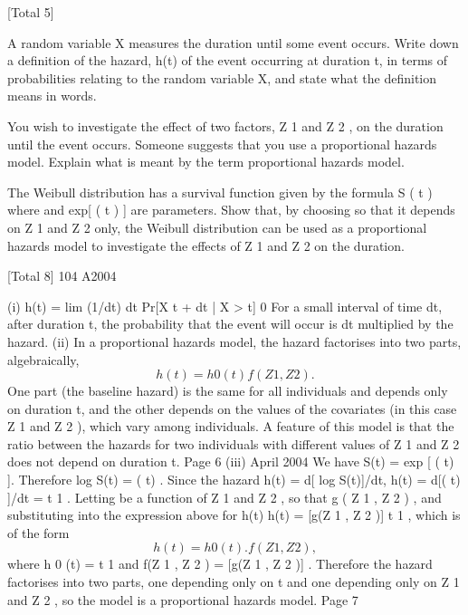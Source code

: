 \documentclass[a4paper,12pt]{article}
\begin{document}
[Total 5]
\item  A random variable X measures the duration until some event occurs. Write
down a definition of the hazard, h(t) of the event occurring at duration t, in
terms of probabilities relating to the random variable X, and state what the
definition means in words.

\item  You wish to investigate the effect of two factors, Z 1 and Z 2 , on the duration
until the event occurs. Someone suggests that you use a proportional hazards
model. Explain what is meant by the term proportional hazards model.

\item  The Weibull distribution has a survival function given by the formula
S ( t )
where and
exp[ ( t ) ]
are parameters.
Show that, by choosing so that it depends on Z 1 and Z 2 only, the Weibull
distribution can be used as a proportional hazards model to investigate the
effects of Z 1 and Z 2 on the duration.

[Total 8]
104 A2004

(i)
h(t) = lim (1/dt)
dt
Pr[X
t + dt | X > t]
0
For a small interval of time dt, after duration t, the probability that the event
will occur is dt multiplied by the hazard.
(ii)
In a proportional hazards model, the hazard factorises into two parts,
algebraically,
\[h ( t ) = h 0 ( t ) f ( Z 1 , Z 2 ) .\]
One part (the baseline hazard) is the same for all individuals and depends only
on duration t, and
the other depends on the values of the covariates (in this case Z 1 and Z 2 ),
which vary among individuals.
A feature of this model is that the ratio between the hazards for two
individuals with different values of Z 1 and Z 2 does not depend on duration t.
Page 6 %
(iii)
April 2004
We have
S(t) = exp [ ( t) ].
Therefore
log S(t) = ( t) .
Since the hazard h(t) = d[ log S(t)]/dt,
h(t) = d[( t) ]/dt =
t
1 .
Letting be a function of Z 1 and Z 2 , so that
g ( Z 1 , Z 2 ) ,
and substituting into the expression above for h(t)
h(t) = [g(Z 1 , Z 2 )]
t
1 ,
which is of the form
\[h(t) = h 0 (t) . f(Z 1 , Z 2 ),\]
where
h 0 (t) = t
1
and f(Z 1 , Z 2 ) = [g(Z 1 , Z 2 )] .
Therefore the hazard factorises into two parts, one depending only on t and
one depending only on Z 1 and Z 2 , so the model is a proportional hazards
model.
Page 7 %
\end{document}
